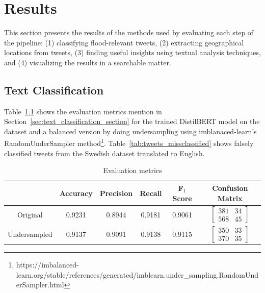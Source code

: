 \chapter{Results}

This section presents the results of the methods used by evaluating each step of the pipeline: (1)
classifying flood-relevant tweets, (2) extracting geographical locations from tweets, (3) finding
useful insights using textual analysis techniques, and (4) visualizing the results in a searchable
matter.

\section{Text Classification}
Table~\ref{tab:metrics} shows the evaluation metrics mention in
Section~\ref{sec:text_classification_section} for the trained DistilBERT model on the dataset and a
balanced version by doing undersampling using imblanaced-learn's RandomUnderSampler
method\footnote{https://imbalanced-learn.org/stable/references/generated/imblearn.under\_sampling.RandomUnderSampler.html}.
Table~\ref{tab:tweets_missclassified} shows falsely classified tweets from the Swedish dataset
translated to English.

\begin{table}
  \center
  \bgroup
  \def\arraystretch{1.5}
  \begin{tabular}{|c|c|c|c|c|c|}
    \hline
            & Accuracy & Precision & Recall & F$_1$ Score & Confusion Matrix\\
            \hline
    Original & 0.9231 & 0.8944 & 0.9181 & 0.9061 &
    $
    \begin{bmatrix}
      381 & 34 \\ 
      568 & 45
    \end{bmatrix}
    $\\
    \hline
    Undersampled & 0.9137 & 0.9091 & 0.9138 & 0.9115 &
    $
    \begin{bmatrix}
      350 & 33\\ 
      370 & 35
    \end{bmatrix}
    $\\
    \hline
  \end{tabular}
  \egroup
  \caption{Evaluation metrics}
  \label{tab:metrics}
\end{table}

